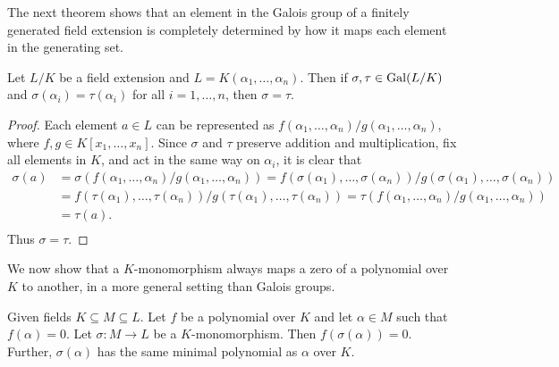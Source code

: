 The next theorem shows that an element in the Galois group of a finitely generated field extension is completely determined by how it maps each element in the generating set. 

\begin{theorem} \label{thm:galois-group-determined-by-generator}
	Let $L/K$ be a field extension and $L = K(\alpha_1, \ldots, \alpha_n)$. Then if $\sigma, \tau \in \operatorname{Gal}(L/K)$ and $\sigma(\alpha_i) = \tau(\alpha_i)$ for all $i = 1, \dots, n$, then $\sigma = \tau$. 
\end{theorem}

\begin{proof}
	Each element $a \in L$ can be represented as $ f(\alpha_1, \dots, \alpha_n) / g(\alpha_1, \dots, \alpha_n)$, where $f, g \in K[x_1, \ldots, x_n]$. Since $\sigma$ and $\tau$ preserve addition and multiplication, fix all elements in $K$, and act in the same way on $\alpha_i$, it is clear that
	\begin{equation*}
		\begin{split}
		\sigma(a) 
			&= \sigma(f(\alpha_1, \dots, \alpha_n) / g(\alpha_1, \dots, \alpha_n)) 
			= f(\sigma(\alpha_1), \dots, \sigma(\alpha_n)) / g(\sigma(\alpha_1), \dots, \sigma(\alpha_n)) \\
			&= f(\tau(\alpha_1), \dots, \tau(\alpha_n)) / g(\tau(\alpha_1), \dots, \tau(\alpha_n))  
			=  \tau(f(\alpha_1, \dots, \alpha_n) / g(\alpha_1, \dots, \alpha_n)) \\
			&= \tau(a).\\ 
		\end{split}
	\end{equation*}
Thus $\sigma = \tau$.
\end{proof}






We now show that a $K$-monomorphism always maps a zero of a polynomial over $K$ to another, in a more general setting than Galois groups. 

\begin{theorem} \label{thm:galois-group-permutes-zeros}
Given fields $K \subseteq M \subseteq L$. Let $f$ be a polynomial over $K$ and let $\alpha \in M$ such that $f(\alpha) = 0$. Let $\sigma : M \to L$ be a $K$-monomorphism. Then $f(\sigma(\alpha)) = 0$. Further, $\sigma(\alpha)$ has the same minimal polynomial as $\alpha$ over $K$. 

\end{theorem}

